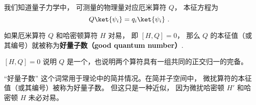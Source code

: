 
\begin{issues}
\issueDraft
{}
\end{issues}


我们知道量子力学中， 可测量的物理量对应厄米算符 $Q$， 本征方程为
\begin{equation}\label{eq_GoodQN_1}
Q \ket{\psi_i} = q_i \ket{\psi_i}~.
\end{equation}

\begin{definition}{}
如果厄米算符 $Q$ 和哈密顿算符 $H$ 对易， 即 $[H, Q] = 0$， 那么 $Q$ 的本征值（或其编号）就被称为\textbf{好量子数（good quantum number）}.
\end{definition}

$[H, Q] = 0$ 说明 $Q$ 是一个，也说明两个算符具有一组共同的正交归一的完备。

“好量子数” 这个词常用于理论中的简并情况。在简并子空间中， 微扰算符的本征值（或其编号）被称为好量子数。 但这只是一种近似， 因为微扰哈密顿 $H'$ 和哈密顿 $H$ 未必对易。
